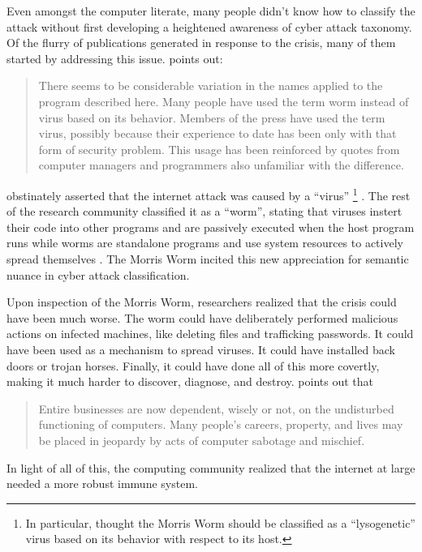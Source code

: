 Even amongst the computer literate, many people didn't know how to classify
the attack without first developing a heightened awareness of cyber attack
taxonomy. Of the flurry of publications generated in response to the crisis,
many of them started by addressing this issue. \cite{spafford_internet_1989-1}
points out:
\begin{quote}
There seems to be considerable variation in the names applied to the program
described here. Many people have used the term worm instead of virus based on its
behavior. Members of the press have used the term virus, possibly because their 
experience  to date has been only with that form of security problem. This usage
has been reinforced by quotes from computer managers and programmers also
unfamiliar with the difference.
\end{quote}
\cite{eichin_microscope_1989} obstinately asserted that the internet
attack was caused by a ``virus''
\footnote{In particular,
\cite{eichin_microscope_1989} thought the Morris Worm should be classified as a
``lysogenetic'' virus based on its behavior with respect to its host.}
. The rest of the research community classified it as a ``worm'', stating that
viruses instert their code into other programs and are passively executed when
the host program runs while worms are standalone programs and use system
resources to actively spread themselves \cite{seeley_tour_1989,
spafford_internet_1989, spafford_internet_1989-1}. The Morris Worm 
incited this new appreciation for semantic nuance in cyber attack
classification. 

Upon inspection of the Morris Worm, researchers realized that the crisis could 
have been much worse. The worm could have deliberately performed malicious
actions on infected machines, like deleting files and trafficking passwords. It
could have been used as a mechanism to spread viruses. It could have installed
back doors or trojan horses. Finally, it could have done all of this more
covertly, making it much harder to discover, diagnose, and destroy.
\cite{spafford_crisis_1989} points out that
\begin{quote}
Entire businesses are now dependent, wisely or not, on the undisturbed
functioning of computers. Many people's careers, property, and lives may be
placed in jeopardy by acts of computer sabotage and mischief.
\end{quote} 

In light of all of this, the computing community realized that the internet at
large needed a more robust immune system.
           	
